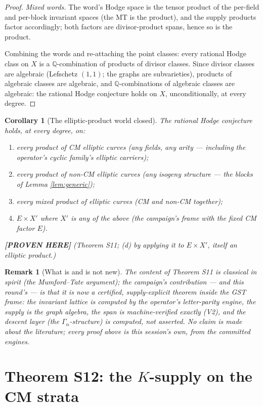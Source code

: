 \documentclass[11pt]{article}
\newtheorem{corollary}[theorem]{Corollary}
\newtheorem{remark}[theorem]{Remark}
\newcommand{\PROVEN}{\textbf{[PROVEN HERE]}}
\newcommand{\Q}{\mathbb{Q}}
\newcommand{\MT}{\mathrm{MT}}
\begin{document}
\begin{proof}
\emph{Mixed words.} The word's Hodge space is the tensor product of the
per-field and per-block invariant spaces (the $\MT$ is the product), and
the supply products factor accordingly; both factors are divisor-product
spans, hence so is the product.

Combining the words and re-attaching the point classes:
every rational Hodge class on $X$ is a $\Q$-combination of products of
divisor classes. Since divisor classes are algebraic
(Lefschetz $(1,1)$; the graphs are subvarieties), products of algebraic
classes are algebraic, and $\Q$-combinations of algebraic classes are
algebraic: the rational Hodge conjecture holds on $X$, unconditionally,
at every degree.
\end{proof}

\begin{corollary}[The elliptic-product world closed]\label{cor:s11}
The rational Hodge conjecture holds, at every degree, on:
\begin{enumerate}[label=(\alph*)]
\item every product of CM elliptic curves (any fields, any arity ---
including the operator's cyclic family's elliptic carriers);
\item every product of non-CM elliptic curves (any isogeny structure ---
the blocks of Lemma \ref{lem:generic});
\item every mixed product of elliptic curves (CM and non-CM together);
\item $E\times X'$ where $X'$ is any of the above (the campaign's frame
with the fixed CM factor $E$).
\end{enumerate}
\PROVEN{} (Theorem S11; (d) by applying it to $E\times X'$, itself an
elliptic product.)
\end{corollary}

\begin{remark}[What is and is not new]
The content of Theorem S11 is classical in spirit (the Mumford--Tate
argument); the campaign's contribution --- and this round's --- is that
it is now a \emph{certified, supply-explicit} theorem inside the GST
frame: the invariant lattice is computed by the operator's letter-parity
engine, the supply is the graph algebra, the span is machine-verified
exactly (V2), and the descent layer (the $\Gamma_\alpha$-structure) is
computed, not asserted. No claim is made about the literature; every
proof above is this session's own, from the committed engines.
\end{remark}

\section{Theorem S12: the \texorpdfstring{$K$}{K}-supply on the CM strata}
\end{document}
